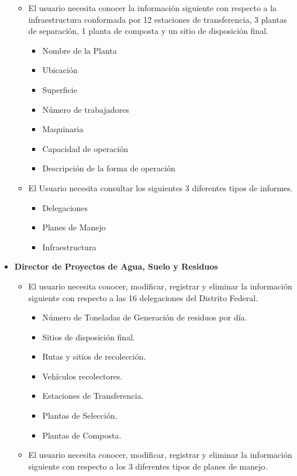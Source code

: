 \begin{itemize}
\begin{itemize}
		\item El usuario necesita conocer la información siguiente con respecto a la infraestructura conformada por 12 estaciones de transferencia, 3 plantas de separación, 1 planta de composta y un sitio de disposición final.
		\begin{itemize}
			\item Nombre de la Planta
			\item Ubicación
			\item Superficie 
			\item Número de trabajadores
			\item Maquinaria
			\item Capacidad de operación 
			\item Descripción de la forma de operación
		\end{itemize}
		\item El Usuario necesita consultar los siguientes 3 diferentes tipos de informes.
			\begin{itemize}
				\item Delegaciones
				\item Planes de Manejo
				\item Infraestructura
			\end{itemize}
	\end{itemize}
	\item\textbf{Director de Proyectos de Agua, Suelo y Residuos}
	\begin{itemize}
		\item El usuario necesita conocer, modificar, registrar y eliminar la información siguiente con respecto a las 16  delegaciones del Distrito Federal.
		\begin{itemize}
			\item Número de Toneladas de Generación de residuos por día.
			\item Sitios de disposición final.
			\item Rutas y sitios de recolección.
			\item Vehículos recolectores.
			\item Estaciones de Transferencia.
			\item Plantas de Selección.
			\item Plantas de Composta.
		\end{itemize}
		\item El usuario necesita conocer, modificar, registrar y eliminar la información siguiente con respecto a los 3 diferentes tipos de planes de manejo.
		\begin{itemize}

\end{itemize}
\end{itemize}
\end{itemize}

